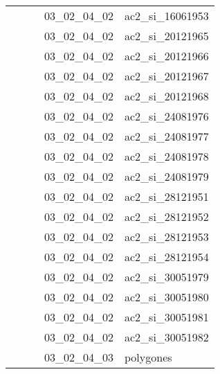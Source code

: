 \documentclass[12pt,titlepage]{book}
\begin{document}
\begin{supertabular}{|p{7.5cm}|p{7.5cm}|p{7.5cm}|c|p{10cm}|}
                   &                    &                    & 03\_02\_04\_02 & ac2\_si\_16061953\\
                   &                    &                    & 03\_02\_04\_02 & ac2\_si\_20121965\\
                   &                    &                    & 03\_02\_04\_02 & ac2\_si\_20121966\\
                   &                    &                    & 03\_02\_04\_02 & ac2\_si\_20121967\\
                   &                    &                    & 03\_02\_04\_02 & ac2\_si\_20121968\\
                   &                    &                    & 03\_02\_04\_02 & ac2\_si\_24081976\\
                   &                    &                    & 03\_02\_04\_02 & ac2\_si\_24081977\\
                   &                    &                    & 03\_02\_04\_02 & ac2\_si\_24081978\\
                   &                    &                    & 03\_02\_04\_02 & ac2\_si\_24081979\\
                   &                    &                    & 03\_02\_04\_02 & ac2\_si\_28121951\\
                   &                    &                    & 03\_02\_04\_02 & ac2\_si\_28121952\\
                   &                    &                    & 03\_02\_04\_02 & ac2\_si\_28121953\\
                   &                    &                    & 03\_02\_04\_02 & ac2\_si\_28121954\\
                   &                    &                    & 03\_02\_04\_02 & ac2\_si\_30051979\\
                   &                    &                    & 03\_02\_04\_02 & ac2\_si\_30051980\\
                   &                    &                    & 03\_02\_04\_02 & ac2\_si\_30051981\\
                   &                    &                    & 03\_02\_04\_02 & ac2\_si\_30051982\\
                   &                    &                    & 03\_02\_04\_03 & polygones\\

\end{supertabular}
\end{document}
